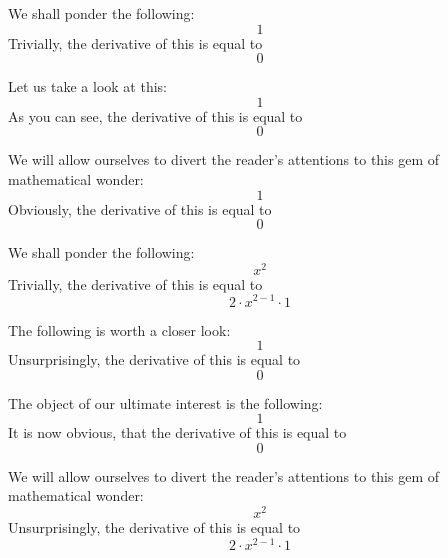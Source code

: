 \documentclass{article}
\begin{document}
We shall ponder the following:
\begin{equation}
1 
\end{equation}
Trivially, the derivative of this is equal to
\begin{equation}
0 
\end{equation}

Let us take a look at this:
\begin{equation}
1 
\end{equation}
As you can see, the derivative of this is equal to
\begin{equation}
0 
\end{equation}

We will allow ourselves to divert the reader's attentions to this gem of mathematical wonder:
\begin{equation}
1 
\end{equation}
Obviously, the derivative of this is equal to
\begin{equation}
0 
\end{equation}

We shall ponder the following:
\begin{equation}
x ^{2 } 
\end{equation}
Trivially, the derivative of this is equal to
\begin{equation}
2 \cdot x ^{2 - 1 } \cdot 1 
\end{equation}

The following is worth a closer look:
\begin{equation}
1 
\end{equation}
Unsurprisingly, the derivative of this is equal to
\begin{equation}
0 
\end{equation}

The object of our ultimate interest is the following:
\begin{equation}
1 
\end{equation}
It is now obvious, that the derivative of this is equal to
\begin{equation}
0 
\end{equation}

We will allow ourselves to divert the reader's attentions to this gem of mathematical wonder:
\begin{equation}
x ^{2 } 
\end{equation}
Unsurprisingly, the derivative of this is equal to
\begin{equation}
2 \cdot x ^{2 - 1 } \cdot 1 
\end{equation}
\end{document}
